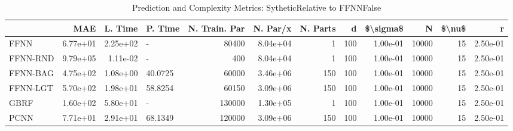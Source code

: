 \begin{table}
\centering
\caption{Prediction and Complexity Metrics: SytheticRelative to FFNNFalse}
\label{tab__Sythetic__Fix_Neurons_QTrue}
\begin{tabular}{lrrlrrrrrrrr}
\toprule
{} &      MAE &  L. Time &  P. Time &  N. Train. Par &  N. Par/x &  N. Parts &    d &  \$\textbackslash sigma\$ &      N &  \$\textbackslash nu\$ &        r \\
\midrule
FFNN     & 6.77e+01 & 2.25e+02 &        - &          80400 &  8.04e+04 &         1 &  100 &  1.00e-01 &  10000 &     15 & 2.50e-01 \\
FFNN-RND & 9.79e+05 & 1.11e-02 &        - &            400 &  8.04e+04 &         1 &  100 &  1.00e-01 &  10000 &     15 & 2.50e-01 \\
FFNN-BAG & 4.75e+02 & 1.08e+00 &  40.0725 &          60000 &  3.46e+06 &       150 &  100 &  1.00e-01 &  10000 &     15 & 2.50e-01 \\
FFNN-LGT & 5.70e+02 & 1.98e+01 &  58.8254 &          60150 &  3.09e+06 &       150 &  100 &  1.00e-01 &  10000 &     15 & 2.50e-01 \\
GBRF     & 1.60e+02 & 5.80e+01 &        - &         130000 &  1.30e+05 &         1 &  100 &  1.00e-01 &  10000 &     15 & 2.50e-01 \\
PCNN     & 7.71e+01 & 2.91e+01 &  68.1349 &         120000 &  3.09e+06 &       150 &  100 &  1.00e-01 &  10000 &     15 & 2.50e-01 \\
\bottomrule
\end{tabular}
\end{table}
